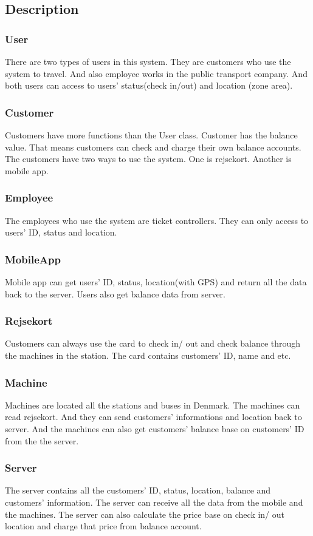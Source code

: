 \subsection*{Description}

\subsubsection{User}
There are two types of users in this system. They are customers who use the system to travel. And also employee works in the public transport company. And both users can access to users’ status(check in/out) and location (zone area).

\subsubsection{Customer}
Customers have more functions than the User class. Customer has the balance value. That means customers can check and charge their own balance accounts. The customers have two ways to use the system. One is rejsekort. Another is mobile app.

\subsubsection{Employee}
The employees who use the system are ticket controllers. They can only access to users’ ID, status and location.

\subsubsection{MobileApp}
Mobile app can get users’ ID, status, location(with GPS) and return all the data back to the server. Users also get balance data from server.

\subsubsection{Rejsekort}
Customers can always use the card to check in/ out and check balance through the machines in the station. The card contains customers’ ID, name and etc.

\subsubsection{Machine}
Machines are located all the stations and buses in Denmark. The machines can read rejsekort. And they can send customers’ informations and location back to server. And the machines can also get customers’ balance base on customers’ ID from the the server.

\subsubsection{Server}
The server contains all the customers’ ID, status, location, balance and customers’ information. The server can receive all the data from the mobile and the machines. The server can also calculate the price base on check in/ out location and charge that price from balance account. 